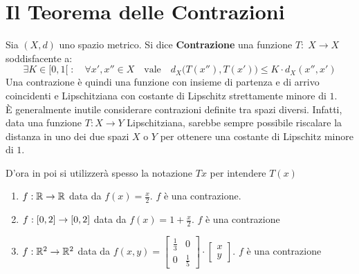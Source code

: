 \newpage
\section{Il Teorema delle Contrazioni}
\begin{definition}[Contrazione]
	\label{def:contrazione}
	Sia $(X, d)$ uno spazio metrico. Si dice \textbf{Contrazione} una funzione $T:\; X \to X$ soddisfacente a:
	\begin{equation}
		\label{eq:def_contrazione}
		\exists K \in [0, 1[ \;: \quad \forall x',x'' \in X \quad \text{vale} \quad d_X \bigl( T(x''), T(x') \bigr) \leq K \cdot d_X(x'', x')
	\end{equation}
	Una contrazione è quindi una funzione con insieme di partenza e di arrivo coincidenti e Lipschitziana con costante di Lipschitz strettamente minore di $1$.\\
	È generalmente inutile considerare contrazioni definite tra spazi diversi. Infatti, data una funzione $T: X \to Y$ Lipschitziana, sarebbe sempre possibile riscalare la distanza in uno dei due spazi $X$ o $Y$ per ottenere una costante di Lipschitz minore di $1$.
	\begin{note}
		D'ora in poi si utilizzerà spesso la notazione $Tx$ per intendere $T(x)$
	\end{note}
\end{definition}
\begin{example}\leavevmode\vspace*{-\baselineskip}
	\begin{enumerate}
		\item $f: \mathbb{R} \to \mathbb{R}$ data da $f(x) = \frac{x}{2}$. $f$ è una contrazione.
		\item $f: \left[0,2\right] \to \left[0,2\right]$ data da $f(x) = 1 + \frac{x}{2}$. $f$ è una contrazione
		\item $f: \mathbb{R}^2 \to \mathbb{R}^2$ data da $f(x,y)=
			\begin{bmatrix}
				\frac{1}{3} & 0\\[1ex]
				0 & \frac{1}{5}
			\end{bmatrix} \cdot
			\begin{bmatrix}
				x\\[1ex]
				y
			\end{bmatrix}$. $f$ è una contrazione
	\end{enumerate}
\end{example}
